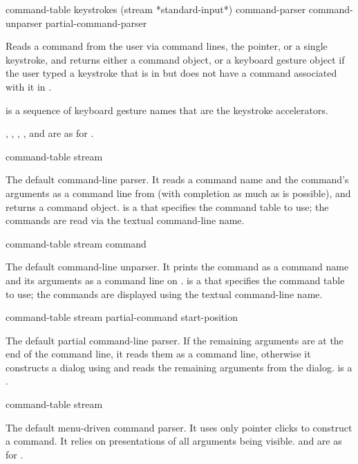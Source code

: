  {command-table keystrokes
                                        \key (stream *standard-input*)
                                             command-parser command-unparser
                                             partial-command-parser}

Reads a command from the user via command lines, the pointer, or a single
keystroke, and returns either a command object, or a keyboard gesture object if
the user typed a keystroke that is in  but does not have a
command associated with it in .

 is a sequence of keyboard gesture names that are the keystroke
accelerators.

, , , ,
and  are as for .


 {command-table stream}

The default command-line parser.  It reads a command name and the command's
arguments as a command line from  (with completion as much as is
possible), and returns a command object.   is a  that specifies the command table to use; the commands are read
via the textual command-line name.

 {command-table stream command}

The default command-line unparser.  It prints the command  as a
command name and its arguments as a command line on .
 is a  that specifies the
command table to use; the commands are displayed using the textual command-line
name.

       {command-table stream partial-command start-position}

The default partial command-line parser.  If the remaining arguments are at the
end of the command line, it reads them as a command line, otherwise it
constructs a dialog using  and reads the remaining
arguments from the dialog.   is a . 

 {command-table stream}

The default menu-driven command parser.  It uses only pointer clicks to
construct a command.  It relies on presentations of all arguments being visible.
 and  are as for .

